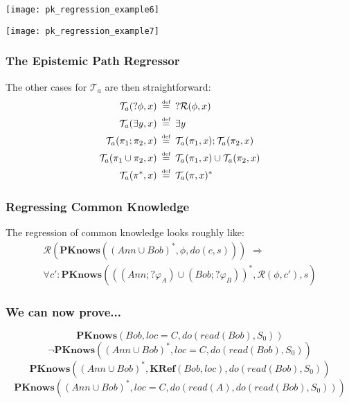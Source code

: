 \documentclass[compress]{beamer}
\newcommand{\isdef}{\hbox{$\stackrel{\mbox{\tiny def}}{=}$}}
\newcommand{\Reg}{\mathcal{R}}
\newcommand{\Trn}{\mathcal{T}}
\newcommand{\TrnA}{\Trn_{a}}
\newcommand{\PKnows}{\mathbf{PKnows}}
\begin{document}
\begin{frame}
\begin{center}
  \texttt{[image: pk\_regression\_example6]}
\end{center}
\end{frame}

\begin{frame}
\begin{center}
  \texttt{[image: pk\_regression\_example7]}
\end{center}
\end{frame}

\begin{frame}
\frametitle{The Epistemic Path Regressor}
The other cases for $\TrnA$ are then straightforward:
\begin{align*}
\TrnA(?\phi,x) & \,\,\,\isdef\,\,\,?\Reg(\phi,x) \\
\TrnA(\exists y,x) & \,\,\,\isdef\,\,\,\exists y \\
\TrnA(\pi_1 ; \pi_2,x) & \,\,\,\isdef\,\,\,\TrnA(\pi_1,x) ; \TrnA(\pi_2,x) \\
\TrnA(\pi_1 \cup \pi_2,x) & \,\,\,\isdef\,\,\,\TrnA(\pi_1,x) \cup \TrnA(\pi_2,x) \\
\TrnA(\pi^*,x) & \,\,\,\isdef\,\,\,\TrnA(\pi,x)^*
\end{align*}
\end{frame}

\begin{frame}
\frametitle{Regressing Common Knowledge}
The regression of common knowledge looks roughly like:
\begin{multline*}
\Reg(\PKnows((Ann \cup Bob)^*,\phi,do(c,s)))\,\,\Rightarrow \\
  \forall c': \PKnows(((Ann ; ?\varphi_A) \cup (Bob ; ?\varphi_B))^*,\Reg(\phi,c'),s)  
\end{multline*}
\end{frame}

\begin{frame}
\frametitle{We can now prove...}
\begin{equation*}
\PKnows(Bob,loc = C,do(read(Bob),S_0))
\end{equation*}
\pause
\begin{equation*}
\neg\PKnows((Ann \cup Bob)^*,loc = C,do(read(Bob),S_0))
\end{equation*}
\pause
\begin{equation*}
\PKnows((Ann \cup Bob)^*,\mathbf{KRef}(Bob,loc),do(read(Bob),S_0))
\end{equation*}
\pause
\begin{equation*}
\PKnows((Ann \cup Bob)^*,loc = C,do(read(A), do(read(Bob),S_0)))
\end{equation*}
\end{frame}
\end{document}
